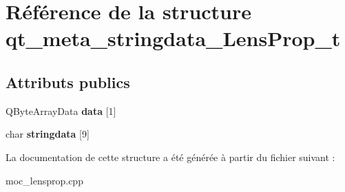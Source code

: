 \hypertarget{structqt__meta__stringdata__LensProp__t}{\section{Référence de la structure qt\+\_\+meta\+\_\+stringdata\+\_\+\+Lens\+Prop\+\_\+t}
\label{structqt__meta__stringdata__LensProp__t}
}
\subsection*{Attributs publics}
\begin{DoxyCompactItemize}
\item 
\hypertarget{structqt__meta__stringdata__LensProp__t_a86bd4059b4ea8cd570f6262eab2aff1f}{Q\+Byte\+Array\+Data {\bfseries data} \mbox{[}1\mbox{]}}\label{structqt__meta__stringdata__LensProp__t_a86bd4059b4ea8cd570f6262eab2aff1f}

\item 
\hypertarget{structqt__meta__stringdata__LensProp__t_a12e562f338817cef90e2f16cc458a9b9}{char {\bfseries stringdata} \mbox{[}9\mbox{]}}\label{structqt__meta__stringdata__LensProp__t_a12e562f338817cef90e2f16cc458a9b9}

\end{DoxyCompactItemize}


La documentation de cette structure a été générée à partir du fichier suivant \+:\begin{DoxyCompactItemize}
\item 
moc\+\_\+lensprop.\+cpp\end{DoxyCompactItemize}
